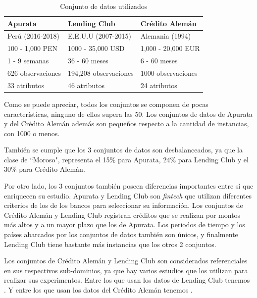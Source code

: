 \begin{table}
	\centering
	\caption{Conjunto de datos utilizados}
	\label{tab:dataset-comparison}
	\begin{tabular}{@{}lll@{}}
	\toprule
	\textbf{Apurata}	& \textbf{Lending Club}		& \textbf{Crédito Alemán}	\\
	\midrule
	Perú (2016-2018)	& E.E.U.U (2007-2015)		& Alemania (1994)			\\
	100 - 1,000 PEN		& 1000 - 35,000 USD			& 1,000 - 20,000 EUR		\\
	1 - 9 semanas		& 36 - 60 meses				& 6 - 60 meses				\\
	626 observaciones	& 194,208 observaciones		& 1000 observaciones		\\
	33 atributos		& 46 atributos				& 24 atributos				\\
	\bottomrule
	\end{tabular}
\end{table}

Como se puede apreciar, todos los conjuntos se componen de pocas características, ninguno de ellos supera las 50. Los conjuntos de datos de Apurata y del Crédito Alemán además son pequeños respecto a la cantidad de instancias, con 1000 o menos.

También se cumple que los 3 conjuntos de datos son desbalanceados, ya que la clase de ``Moroso", representa el 15\% para Apurata, 24\% para Lending Club y el 30\% para Crédito Alemán.

Por otro lado, los 3 conjuntos también poseen diferencias importantes entre sí que enriquecen su estudio. Apurata y Lending Club son \textit{fintech} que utilizan diferentes criterios de los de los bancos para seleccionar su información. Los conjuntos de Crédito Alemán y Lending Club registran créditos que se realizan por montos más altos y a un mayor plazo que los de Apurata. Los periodos de tiempo y los países abarcados por los conjuntos de datos también son únicos, y finalmente Lending Club tiene bastante más instancias que los otros 2 conjuntos.

Los conjuntos de Crédito Alemán y Lending Club son considerados referenciales en sus respectivos sub-dominios, ya que hay varios estudios que los utilizan para realizar sus experimentos. Entre los que usan los datos de Lending Club tenemos \citep{malekipirbazari2015risk, zhang2016research, zang2014credit, tan2018deep}. Y entre los que usan los datos del Crédito Alemán tenemos \citep{harris2015credit, nanni2009experimental, brown2012experimental, wang2012two}.

